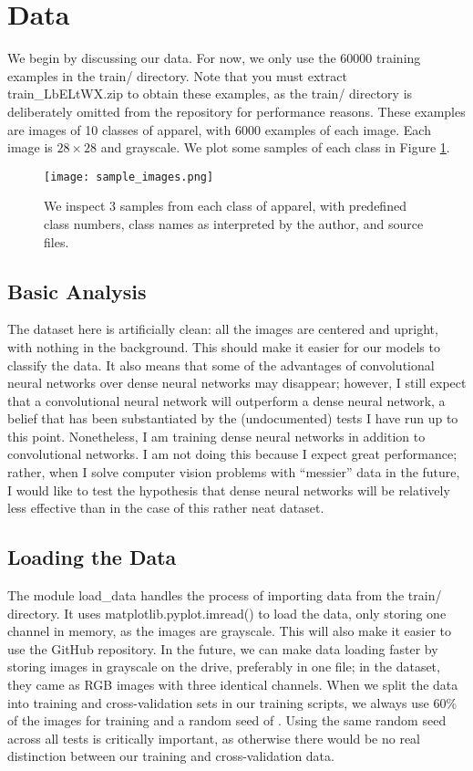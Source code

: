 \section{Data}
We begin by discussing our data. For now, we only use the 60000 training examples in the {\ttfamily train/} directory. Note that you must extract {\ttfamily train\_LbELtWX.zip} to obtain these examples, as the {\ttfamily train/} directory is deliberately omitted from the repository for performance reasons. These examples are images of 10 classes of apparel, with 6000 examples of each image. Each image is $28\times 28$ and grayscale. We plot some samples of each class in Figure \ref{fig:sampleimages}.

\begin{figure}
\texttt{[image: sample\_images.png]}
\caption{We inspect 3 samples from each class of apparel, with predefined class numbers, class names as interpreted by the author, and source files.}
\label{fig:sampleimages}
\end{figure}
\subsection{Basic Analysis}
The dataset here is artificially clean: all the images are centered and upright, with nothing in the background. This should make it easier for our models to classify the data. It also means that some of the advantages of convolutional neural networks over dense neural networks may disappear; however, I still expect that a convolutional neural network will outperform a dense neural network, a belief that has been substantiated by the (undocumented) tests I have run up to this point. Nonetheless, I am training dense neural networks in addition to convolutional networks. I am not doing this because I expect great performance; rather, when I solve computer vision problems with ``messier'' data in the future, I would like to test the hypothesis that dense neural networks will be relatively less effective than in the case of this rather neat dataset.
\subsection{Loading the Data}
The module {\ttfamily load\_data} handles the process of importing data from the {\ttfamily train/} directory. It uses {\ttfamily matplotlib.pyplot.imread()} to load the data, only storing one channel in memory, as the images are grayscale. This will also make it easier to use the GitHub repository. In the future, we can make data loading faster by storing images in grayscale on the drive, preferably in one file; in the dataset, they came as RGB images with three identical channels. When we split the data into training and cross-validation sets in our training scripts, we always use 60\% of the images for training and a random seed of {}. Using the same random seed across all tests is critically important, as otherwise there would be no real distinction between our training and cross-validation data.

